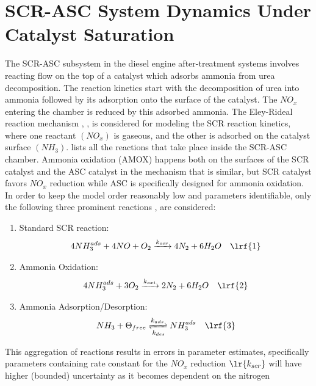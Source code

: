 \section{SCR-ASC System Dynamics Under Catalyst Saturation}
The SCR-ASC subsystem in the diesel engine after-treatment systems involves reacting flow on the top of a catalyst which
adsorbs ammonia from urea decomposition. The reaction kinetics start with the decomposition of urea into ammonia
followed by its adsorption onto the surface of the catalyst. The $NO_x$ entering the chamber is reduced by this adsorbed
ammonia. The Eley-Rideal reaction mechanism \cite{yuan2015diesel}, \cite{hsieh2011development}, \cite{nova2014urea} is
considered for modeling the SCR reaction kinetics, where one reactant $(NO_x)$ is gaseous, and the other is adsorbed on
the catalyst surface $(NH_3)$. \cite{nova2014urea} lists all the reactions that take place inside the
SCR-ASC chamber. Ammonia oxidation (AMOX) happens both on the surfaces of the SCR catalyst and the ASC catalyst in the
mechanism that is similar, but SCR catalyst favors $NO_x$ reduction while ASC is specifically designed for ammonia
oxidation.
In order to keep the model order reasonably low and parameters identifiable, only the following three prominent reactions \cite{devarakonda2008adequacy},\cite{hsieh2011development} are considered:
\begin{enumerate}
    \item Standard SCR reaction:
    \begin{align*}
        4 NH_3 ^{ads} + 4 NO + O_2 &\xrightarrow[]{k_{scr}} 4 N_2 + 6 H_2O %
        & \lrf{1}
    \end{align*}
    \item Ammonia Oxidation:
    \begin{align*}
        4 NH_3^{ads} + 3 O_2 &\xrightarrow[]{k_{oxi}} 2 N_2 + 6 H_2O %
        & \lrf{2}
    \end{align*}
    \item Ammonia Adsorption/Desorption:
        \begin{align*}
            NH_3 + \Theta_{free} &\xrightleftharpoons[k_{des}]{k_{ads}} NH_3^{ads}
            & \lrf{3}
        \end{align*}
\end{enumerate}
This aggregation of reactions results in errors in parameter estimates, specifically parameters containing rate constant
for the $NO_x$ reduction $\lr{k_{scr}}$ will have higher (bounded) uncertainty as it becomes dependent on the nitrogen
